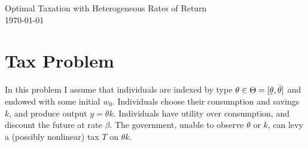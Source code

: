 \documentclass[11pt]{article}
\newcommand{\ubar}[1]{\underaccent{\bar}{#1}}
\begin{document}
    \begin{flushleft}
        Optimal Taxation with Heterogeneous Rates of Return \\
        \today
    \end{flushleft}

\section{Tax Problem} \label{s1}

In this problem I assume that individuals are indexed by type \( \theta\in\Theta = [\ubar{\theta}, \bar{\theta}] \) and endowed with some initial \( w_0 \). Individuals choose their consumption and savings \( k \), and produce output \( y = \theta k \). Individuals have utility over consumption, and discount the future at rate \( \beta \). The government, unable to observe \( \theta \) or \( k \), can levy a (possibly nonlinear) tax \( T \) on \( \theta k \). 
\end{document}
